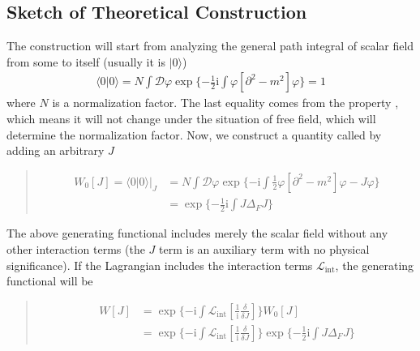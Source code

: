 \documentclass[letterpaper,10pt,english]{sphinxmanual}
\begin{document}
\subsection{Sketch of Theoretical Construction}
\label{\detokenize{qft_sketch:sketch-of-theoretical-construction}}
The construction will start from analyzing the general path integral of scalar field from some  to itself (usually it is  \(|0\rangle\))
\begin{equation*}
\begin{split}\langle 0|0\rangle = N\int\mathcal{D}\varphi\exp\{-\frac{1}{2}\mathrm{i}\int\varphi[\partial^2-m^2]\varphi\} = 1\end{split}
\end{equation*}
where \(N\) is a normalization factor. The last equality comes from the property , which means it will not change under the situation of free field, which will determine the normalization factor. Now, we construct a quantity called  by adding an arbitrary  \(J\)
\begin{quote}

\begin{equation*}
\begin{split}W_0[J] = \langle 0|0\rangle |_J &= N\int\mathcal{D}\varphi\exp\{-\mathrm{i}\int\frac{1}{2}\varphi[\partial^2-m^2]\varphi - J\varphi\}\\
&= \exp\{-\frac{1}{2}\mathrm{i}\int J\Delta_FJ\}\end{split}
\end{equation*}\end{quote}

The above generating functional includes merely the scalar field without any other  interaction terms (the \(J\) term is an auxiliary term with no physical significance). If the Lagrangian includes the interaction terms \(\mathcal{L}_{\text{int}}\), the generating functional will be
\begin{quote}

\begin{equation*}
\begin{split}W[J] &= \exp\{-\mathrm{i}\int\mathcal{L}_{\text{int}}\!\!\left[\frac{1}{\mathrm{i}}\!\frac{\delta}{\delta J}\right]\} W_0[J] \\
&= \exp\{-\mathrm{i}\int\mathcal{L}_{\text{int}}\!\!\left[\frac{1}{\mathrm{i}}\!\frac{\delta}{\delta J}\right]\}\exp\{-\frac{1}{2}\mathrm{i}\int J\Delta_FJ\}\end{split}
\end{equation*}\end{quote}
\end{document}
